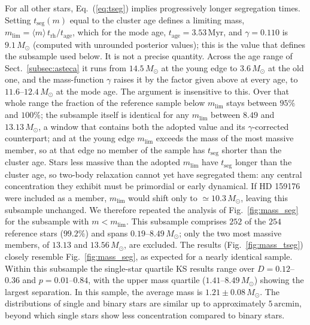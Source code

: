 \documentclass{aa}
\begin{document}
For all other stars, Eq.~(\ref{eq:tseg}) implies progressively longer segregation times. Setting $t_{\mathrm{seg}}(m)$ equal to the cluster age defines a limiting mass, $m_{\mathrm{lim}} = \langle m \rangle\, t_{\mathrm{rh}}/t_{\mathrm{age}}$, which for the mode age, $t_{\mathrm{age}} = 3.53\,\mathrm{Myr}$, and $\gamma=0.110$ is $9.1\,M_\odot$ (computed with unrounded posterior values); this is the value that defines the subsample used below. It is not a precise quantity. Across the age range of Sect.~\ref{subsec:asteca} it runs from $14.5\,M_\odot$ at the young edge to $3.6\,M_\odot$ at the old one, and the mass-function $\gamma$ raises it by the factor given above at every age, to $11.6$--$12.4\,M_\odot$ at the mode age. The argument is insensitive to this. Over that whole range the fraction of the reference sample below $m_{\mathrm{lim}}$ stays between $95\%$ and $100\%$; the subsample itself is identical for any $m_{\mathrm{lim}}$ between $8.49$ and $13.13\,M_\odot$, a window that contains both the adopted value and its $\gamma$-corrected counterpart; and at the young edge $m_{\mathrm{lim}}$ exceeds the mass of the most massive member, so at that edge no member of the sample has $t_{\mathrm{seg}}$ shorter than the cluster age. Stars less massive than the adopted $m_{\mathrm{lim}}$ have $t_{\mathrm{seg}}$ longer than the cluster age, so two-body relaxation cannot yet have segregated them: any central concentration they exhibit must be primordial or early dynamical. If HD 159176 were included as a member, $m_{\mathrm{lim}}$ would shift only to $\simeq10.3\,M_\odot$, leaving this subsample unchanged. We therefore repeated the analysis of Fig.~\ref{fig:mass_seg} for the subsample with $m < m_{\mathrm{lim}}$. This subsample comprises $252$ of the $254$ reference stars ($99.2\%$) and spans $0.19$--$8.49\,M_\odot$; only the two most massive members, of $13.13$ and $13.56\,M_\odot$, are excluded. The results (Fig.~\ref{fig:mass_tseg}) closely resemble Fig.~\ref{fig:mass_seg}, as expected for a nearly identical sample. Within this subsample the single-star quartile KS results range over $D=0.12$--$0.36$ and $p=0.01$--$0.84$, with the upper mass quartile ($1.41$--$8.49\,M_\odot$) showing the largest separation. In this sample, the average mass is $1.21 \pm 0.08\,M_\odot$. The distributions of single and binary stars are similar up to approximately $5\,\mathrm{arcmin}$, beyond which single stars show less concentration compared to binary stars.
\end{document}
